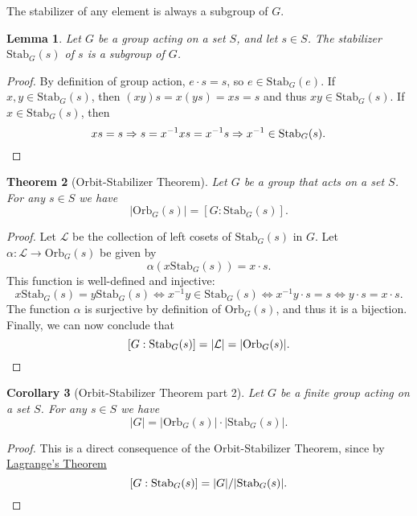 \documentclass[12pt]{report}
\newtheorem{theorem}{Theorem}[chapter]
\newtheorem{lemma}[theorem]{Lemma}
\newtheorem{corollary}[theorem]{Corollary}
\numberwithin{equation}{section}
\numberwithin{theorem}{chapter}
\theoremstyle{definition}
\newtheorem*{basic properties}{Basic Properties}
\newtheorem*{Important Remark}{Important Remark}
\begin{document}
The stabilizer of any element is always a subgroup of $G$.


\begin{lemma}\label{stabilizer is a subgroup}
Let $G$ be a group acting on a set $S$, and let $s \in S$. The stabilizer $\mathrm{Stab}_G(s)$ of $s$ is a subgroup of $G$.
\end{lemma}

\begin{proof}
By definition of group action, $e \cdot s = s$, so $e \in \mathrm{Stab}_G(e)$.
If $x,y \in \mathrm{Stab}_G(s)$, then $(xy)s = x(ys) = xs = s$ and thus $xy \in \mathrm{Stab}_G(s)$. If $x \in \mathrm{Stab}_G(s)$, then 
$$xs = s \Rightarrow s = x^{-1}xs = x^{-1}s \Rightarrow x^{-1} \in \mathrm{Stab}_G(s).\qedhere$$
\end{proof}


\begin{theorem}[Orbit-Stabilizer Theorem]
Let $G$ be a group that acts on a set $S$. For any $s \in S$ we have
$$|\mathrm{Orb}_G(s)| = [G: \mathrm{Stab}_G(s)].$$
\end{theorem}

\begin{proof} 
Let $\mathcal{L}$ be the collection of left cosets of $\mathrm{Stab}_G(s)$ in $G$. Let $\alpha: \mathcal{L} \to \mathrm{Orb}_G(s)$ be given by
$$\alpha(x \mathrm{Stab}_G(s)) = x \cdot s.$$ 
This function is well-defined and injective: 
$$
x \mathrm{Stab}_G(s) = y \mathrm{Stab}_G(s)\iff x^{-1}y \in \mathrm{Stab}_G(s) \iff x^{-1}y \cdot s = s \iff 
y \cdot s = x \cdot s.
$$
The function $\alpha$ is surjective by definition of $\mathrm{Orb}_G(s)$, and thus it is a bijection. Finally, we can now conclude that 
$$[G: \mathrm{Stab}_G(s)] = |\mathcal{L}| = |\mathrm{Orb}_G(s)|.\qedhere$$
\end{proof}




\begin{corollary}[Orbit-Stabilizer Theorem part 2]\label{Orbit-Stabilizer Theorem}
Let $G$ be a finite group acting on a set $S$. For any $s \in S$ we have
$$|G|=|\mathrm{Orb}_G(s)| \cdot |\mathrm{Stab}_G(s)|.$$
\end{corollary}

\begin{proof}
This is a direct consequence of the Orbit-Stabilizer Theorem, since by \hyperref[Lagrange]{Lagrange's Theorem} 
$$[G: \mathrm{Stab}_G(s)]=|G|/|\mathrm{Stab}_G(s)|.\qedhere$$
\end{proof}
\end{document}
